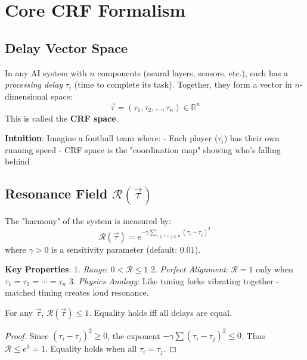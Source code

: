 \section{Core CRF Formalism}  
\label{sec:theory}  

\subsection{Delay Vector Space}  
\begin{definition}  
In any AI system with $n$ components (neural layers, sensors, etc.), each has a \textit{processing delay} $\tau_i$ (time to complete its task). Together, they form a vector in $n$-dimensional space:  
\[  
\vec{\tau} = (\tau_1, \tau_2, \dots, \tau_n) \in \mathbb{R}^n  
\]  
This is called the \textbf{CRF space}.  
\end{definition}  

\textbf{Intuition}: Imagine a football team where:  
- Each player ($\tau_i$) has their own running speed  
- CRF space is the "coordination map" showing who's falling behind  

\subsection{Resonance Field $\mathcal{R}(\vec{\tau})$}  
\begin{definition}  
The "harmony" of the system is measured by:  
\[  
\mathcal{R}(\vec{\tau}) = e^{-\gamma \sum_{1 \leq i < j \leq n} (\tau_i - \tau_j)^2}  
\]  
where $\gamma > 0$ is a sensitivity parameter (default: $0.01$).  
\end{definition}  

\textbf{Key Properties}:  
1. \textit{Range}: $0 < \mathcal{R} \leq 1$  
2. \textit{Perfect Alignment}: $\mathcal{R} = 1$ only when $\tau_1 = \tau_2 = \cdots = \tau_n$  
3. \textit{Physics Analogy}: Like tuning forks vibrating together - matched timing creates loud resonance.  

\begin{theorem}  
\label{thm:maxR}  
For any $\vec{\tau}$, $\mathcal{R}(\vec{\tau}) \leq 1$. Equality holds iff all delays are equal.  
\end{theorem}  
\begin{proof}  
Since $(\tau_i - \tau_j)^2 \geq 0$, the exponent $-\gamma \sum (\tau_i - \tau_j)^2 \leq 0$. Thus $\mathcal{R} \leq e^0 = 1$. Equality holds when all $\tau_i = \tau_j$.  
\end{proof}  

